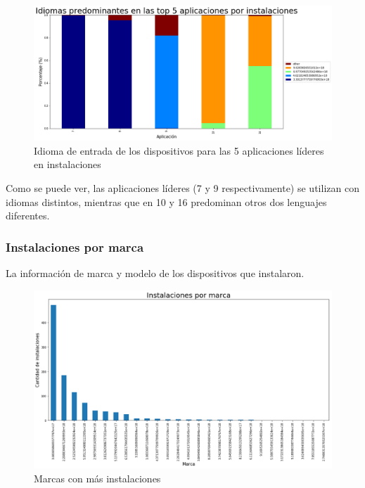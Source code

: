 \documentclass[a4paper, 12pt]{article}
\begin{document}
		\FloatBarrier
		\begin{figure}[h]
			\centering
			\includegraphics[width=\textwidth]{images/installs/idiomasapps.png}
			\caption{Idioma de entrada de los dispositivos para las 5 aplicaciones líderes en instalaciones}
		\end{figure}
		\FloatBarrier

		Como se puede ver, las aplicaciones líderes (7 y 9 respectivamente) se utilizan con idiomas distintos, mientras que en 10 y 16 predominan otros dos lenguajes diferentes.

	\subsubsection{Instalaciones por marca}

		La información de marca y modelo de los dispositivos que instalaron.

		\FloatBarrier
		\begin{figure}[h]
			\centering
			\includegraphics[width=\textwidth]{images/installs/marcas.png}
			\caption{Marcas con más instalaciones}
		\end{figure}
		\FloatBarrier
\end{document}
